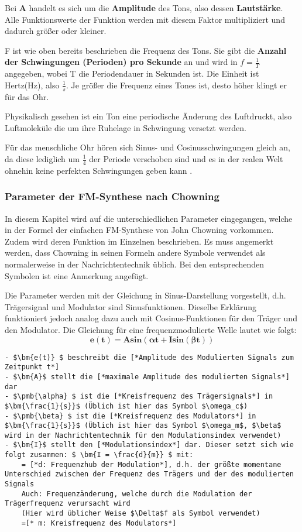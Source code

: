 Bei $\bm{A}$ handelt es sich um die \textbf{Amplitude} des Tons, also dessen \textbf{Lautstärke}. Alle Funktionswerte der Funktion werden mit diesem Faktor multipliziert und dadurch größer oder kleiner.

F ist wie oben bereits beschrieben die Frequenz des Tons. Sie gibt die \textbf{Anzahl der Schwingungen (Perioden) pro Sekunde} an und wird in $f=\frac{1}{T}$ angegeben, wobei T die Periodendauer in Sekunden ist. Die Einheit ist Hertz(Hz), also $\frac{1}{s}$.
Je größer die Frequenz eines Tones ist, desto höher klingt er für das Ohr.

Physikalisch gesehen ist ein Ton eine periodische Änderung des Luftdruckt, also Luftmoleküle die um ihre Ruhelage in Schwingung versetzt werden\cite[s. 111 f.]{zwicker}. 

Für das menschliche Ohr hören sich Sinus- und Cosinusschwingungen gleich an, da diese lediglich um $\frac{1}{4}$ der Periode verschoben sind und es in der realen Welt ohnehin keine perfekten Schwingungen geben kann \cite[s. 3f.]{zwicker}. 

\FloatBarrier
\subsubsection{Parameter der FM-Synthese nach Chowning}
\label{chowningparameter}

In diesem Kapitel wird auf die unterschiedlichen Parameter eingegangen, welche in der Formel der einfachen FM-Synthese von John Chowning vorkommen. Zudem wird deren Funktion im Einzelnen beschrieben. Es muss angemerkt werden, dass Chowning in seinen Formeln andere Symbole verwendet als normalerweise in der Nachrichtentechnik üblich. Bei den entsprechenden Symbolen ist eine Anmerkung angefügt.

Die Parameter werden mit der Gleichung in Sinus-Darstellung vorgestellt, d.h. Trägersignal und Modulator sind Sinusfunktionen. Dieselbe Erklärung funktioniert jedoch analog dazu auch mit Cosinus-Funktionen für den Träger und den Modulator.
Die Gleichung für eine frequenzmodulierte Welle lautet wie folgt:
\[ \bm{e(t) = A sin(\pmb{\alpha} t + I sin(\pmb{\beta} t))} \]

\begin{lstlisting}[mathescape]
- $\bm{e(t)} $ beschreibt die [*Amplitude des Modulierten Signals zum Zeitpunkt t*]
- $\bm{A}$ stellt die [*maximale Amplitude des modulierten Signals*] dar
- $\pmb{\alpha} $ ist die [*Kreisfrequenz des Trägersignals*] in $\bm{\frac{1}{s}}$ (Üblich ist hier das Symbol $\omega_c$)
- $\pmb{\beta} $ ist die [*Kreisfrequenz des Modulators*] in $\bm{\frac{1}{s}}$ (Üblich ist hier das Symbol $\omega_m$, $\beta$ wird in der Nachrichtentechnik für den Modulationsindex verwendet)
- $\bm{I}$ stellt den [*Modulationsindex*] dar. Dieser setzt sich wie folgt zusammen: $ \bm{I = \frac{d}{m}} $ mit:
	= [*d: Frequenzhub der Modulation*], d.h. der größte momentane Unterschied zwischen der Frequenz des Trägers und der des modulierten Signals
	Auch: Frequenzänderung, welche durch die Modulation der Trägerfrequenz verursacht wird
	(Hier wird üblicher Weise $\Delta$f als Symbol verwendet)
	=[* m: Kreisfrequenz des Modulators*]
\end{lstlisting} \cite{chowningPaper}

